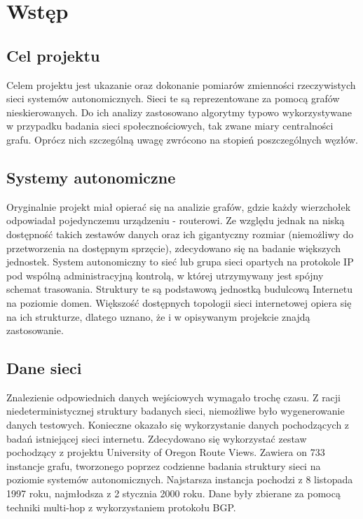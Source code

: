 \chapter{Wstęp}
\section{Cel projektu}

Celem projektu jest ukazanie oraz dokonanie pomiarów zmienności rzeczywistych sieci systemów autonomicznych. Sieci te są reprezentowane za pomocą grafów nieskierowanych. Do ich analizy zastosowano algorytmy typowo wykorzystywane w przypadku badania sieci społecznościowych, tak zwane miary centralności grafu. Oprócz nich szczególną uwagę zwrócono na stopień poszczególnych węzłów.

\section{Systemy autonomiczne}
Oryginalnie projekt miał opierać się na analizie grafów, gdzie każdy wierzchołek odpowiadał pojedynczemu urządzeniu - routerowi. Ze względu jednak na niską dostępność takich zestawów danych oraz ich gigantyczny rozmiar (niemożliwy do przetworzenia na dostępnym sprzęcie), zdecydowano się na badanie większych jednostek. System autonomiczny to sieć lub grupa sieci opartych na protokole IP pod wspólną administracyjną kontrolą, w której utrzymywany jest spójny schemat trasowania. Struktury te są podstawową jednostką budulcową Internetu na poziomie domen. Większość dostępnych topologii sieci internetowej opiera się na ich strukturze, dlatego uznano, że i w opisywanym projekcie znajdą zastosowanie.

\section{Dane sieci}

Znalezienie odpowiednich danych wejściowych wymagało trochę czasu. Z racji niedeterministycznej struktury badanych sieci, niemożliwe było wygenerowanie danych testowych. Konieczne okazało się wykorzystanie danych pochodzących z badań istniejącej sieci internetu. Zdecydowano się wykorzystać zestaw pochodzący z projektu University of Oregon Route Views. Zawiera on 733 instancje grafu, tworzonego poprzez codzienne badania struktury sieci na poziomie systemów autonomicznych. Najstarsza instancja pochodzi z 8 listopada 1997 roku, najmłodsza z 2 stycznia 2000 roku. Dane były zbierane za pomocą techniki multi-hop z wykorzystaniem protokołu BGP.  

